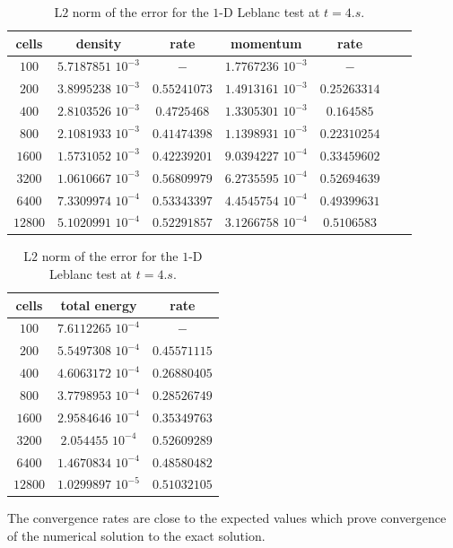 \begin{table}[H]
\begin{center}
 \caption{\label{tbl:l2_norm_leblanc} L$2$ norm of the error for the $1$-D Leblanc test at $t=4.s$.}
 \begin{tabular}{|c|c|c|c|c|c|c|}
 \hline
   cells & density & rate & momentum & rate \\
 \hline
$100$ &   $5.7187851$ $10^{-3}$ & $-$ & $1.7767236$ $10^{-3}$ & $-$ \\
  \hline
$200$  &  $3.8995238$ $10^{-3}$ & $0.55241073$ & $1.4913161$ $10^{-3}$ & $0.25263314$ \\
   \hline
$400$ & $2.8103526$ $10^{-3}$   & $0.4725468$ & $1.3305301$ $10^{-3}$ & $0.164585$ \\
 \hline
$800$ & $2.1081933$ $10^{-3}$   & $0.41474398$ & $1.1398931$ $10^{-3}$ & $0.22310254$ \\
 \hline
$1600$ & $1.5731052$ $10^{-3}$  & $0.42239201$ & $9.0394227$ $10^{-4}$ & $0.33459602$ \\
 \hline
$3200$&$1.0610667$ $10^{-3}$    & $0.56809979$ & $6.2735595$ $10^{-4}$ & $0.52694639$ \\
 \hline
$6400$&$7.3309974$ $10^{-4}$    & $0.53343397$ & $4.4545754$ $10^{-4}$ & $0.49399631$ \\
 \hline
 $12800$&$5.1020991$ $10^{-4}$  & $0.52291857$ & $3.1266758$ $10^{-4}$ & $0.5106583$ \\
 \hline
\end{tabular}
\begin{tabular}{|c|c|c|}
\hline
cells & total energy & rate \\ \hline
$100$ & $7.6112265$  $10^{-4}$& $-$\\ \hline
$200$ & $5.5497308$ $10^{-4}$& $0.45571115$\\ \hline
$400$ & $4.6063172$ $10^{-4}$ & $0.26880405$\\ \hline
$800$ & $3.7798953$ $10^{-4}$ & $0.28526749$\\ \hline
$1600$ & $2.9584646$ $10^{-4}$ & $0.35349763$\\ \hline
$3200$ & $2.054455$ $10^{-4}$ & $0.52609289$\\ \hline
$6400$ & $1.4670834$ $10^{-4}$ & $0.48580482$\\ \hline
$12800$ & $1.0299897$ $10^{-5}$ & $0.51032105$\\  \hline
\end{tabular}
\end{center}
\nonumber
\end{table}
The convergence rates are close to the expected values which prove convergence of the numerical solution to the exact solution.
